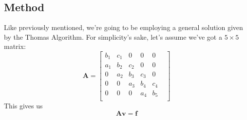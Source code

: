\documentclass{article}
\begin{document}
\subsection{Method}
Like previously mentioned, we're going to be employing a general solution given by the Thomas Algorithm.
For simplicity's sake, let's assume we've got a $5\times 5$ matrix:
\[
\mathbf{A}=\begin{bmatrix}
                           b_1& c_1& 0& 0& 0& \\
                           a_1& b_2& c_2& 0& 0& \\
                           0& a_2& b_3& c_3& 0& \\
                           0& 0& a_3& b_4& c_4& \\
                           0& 0& 0& a_4& b_5& \\
\end{bmatrix}
\]
This gives us $$\mathbf{A}\mathbf{v}=\mathbf{f}$$
\end{document}
